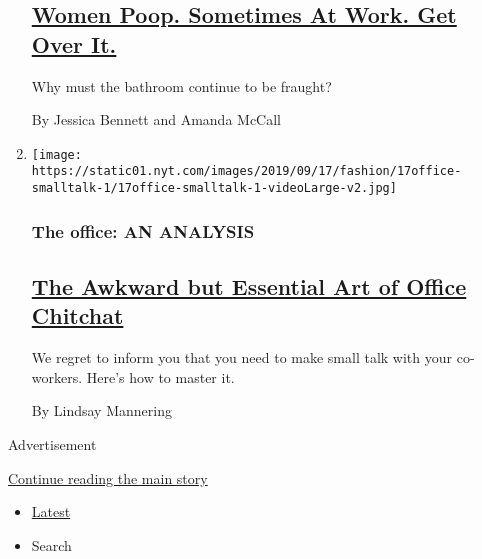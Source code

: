 \begin{enumerate}
  \hypertarget{women-poop-sometimes-at-work-get-over-it}{%
  \subsection{\texorpdfstring{\href{/2019/09/17/style/women-poop-at-work.html}{Women
  Poop. Sometimes At Work. Get Over
  It.}}{Women Poop. Sometimes At Work. Get Over It.}}\label{women-poop-sometimes-at-work-get-over-it}}

  Why must the bathroom continue to be fraught?

  By Jessica Bennett and Amanda McCall
\item
  \texttt{[image: https://static01.nyt.com/images/2019/09/17/fashion/17office-smalltalk-1/17office-smalltalk-1-videoLarge-v2.jpg]}

  \hypertarget{the-office-an-analysis-3}{%
  \subsubsection{The office: AN
  ANALYSIS}\label{the-office-an-analysis-3}}

  \hypertarget{the-awkward-but-essential-art-of-office-chitchat}{%
  \subsection{\texorpdfstring{\href{/2019/09/17/style/the-awkward-art-of-office-small-talk.html}{The
  Awkward but Essential Art of Office
  Chitchat}}{The Awkward but Essential Art of Office Chitchat}}\label{the-awkward-but-essential-art-of-office-chitchat}}

  We regret to inform you that you need to make small talk with your
  co-workers. Here's how to master it.

  By Lindsay Mannering
\end{enumerate}

Advertisement

\protect\hyperlink{after-mid1}{Continue reading the main story}

\begin{itemize}
\tightlist
\item
  \protect\hyperlink{stream-panel}{Latest}
\item
  Search
\end{itemize}

